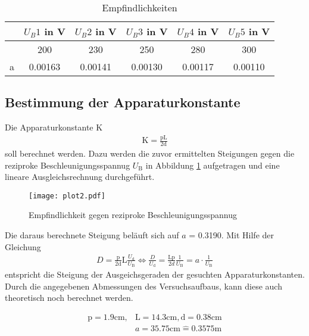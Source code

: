 \FloatBarrier
\begin{table}
  \centering
  \caption{Empfindlichkeiten}
  \label{tab:messwerte2}
  \begin{tabular}{c c c c c c}
  \toprule
   & $U_B 1$ in V & $U_B 2$ in V & $U_B 3$ in V & $U_B 4$ in V & $U_B 5$ in V \\
  \midrule
   & 200 & 230 & 250 & 280 & 300 \\
  \bottomrule
  a & 0.00163 & 0.00141 & 0.00130 & 0.00117 & 0.00110 \\
  \bottomrule
\end{tabular}
\end{table}

\noindent

\subsection{Bestimmung der Apparaturkonstante}
\label{sec:Apparaturkonstante}

Die Apparaturkonstante K
\begin{align*}
  \text{K} = \frac{\text{pL}}{\text{2d}}
\end{align*}
soll berechnet werden. 
Dazu werden die zuvor ermittelten Steigungen gegen die reziproke Beschleunigungsspannug $U_\text{B}$ in Abbildung \ref{fig:plot2} aufgetragen und eine lineare Ausgleichsrechnung durchgeführt.

\FloatBarrier
\begin{figure}
  \centering
  \texttt{[image: plot2.pdf]}
  \caption{Empfindlichkeit gegen reziproke Beschleunigungsspannug}
  \label{fig:plot2}
\end{figure}

\noindent
Die daraus berechnete Steigung beläuft sich auf $a$ = 0.3190.
Mit Hilfe der Gleichung
\begin{align*}
  D = \frac{\text{p}}{\text{2d}}\text{L}\frac{U_\text{d}}{U_\text{B}} \Leftrightarrow \frac{D}{U_\text{d}} = \frac{\text{Lp}}{2d} \frac{1}{U_\text{B}} = a \cdot \frac{1}{U_\text{B}}
\end{align*}
entspricht die Steigung der Ausgeichsgeraden der gesuchten Apparaturkonstanten.
Durch die angegebenen Abmessungen des Versuchsaufbaus, kann diese auch theoretisch noch berechnet werden.

\begin{align*}
  \text{p} = 1.9 \text{cm}, & \text{L} = 14.3 \text{cm}, \text{d} = 0.38 \text{cm} \\
  & a = 35.75 \text{cm}	\widehat{=} 0.3575 \text{m}
\end{align*}

